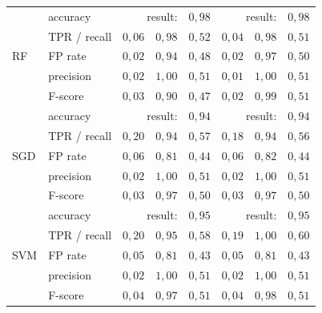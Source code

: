 \begin{table}[t]
{\begin{tabular}{llrrrrrr}
\midrule
\multirow{5}{*}{RF}  & accuracy     & \multicolumn{2}{r}{result:} & $0,98$            & \multicolumn{2}{r}{result:} & $0,98$              \\
                     & TPR / recall & $0,06$    & $0,98$          & $0,52$            & $0,04$    & $0,98$          & $0,51$              \\
                     & FP rate      & $0,02$    & $0,94$          & $0,48$            & $0,02$    & $0,97$          & $0,50$              \\
                     & precision    & $0,02$    & $1,00$          & $0,51$            & $0,01$    & $1,00$          & $0,51$              \\
                     & F-score      & $0,03$    & $0,90$          & $0,47$            & $0,02$    & $0,99$          & $0,51$              \\ 
\midrule
\multirow{5}{*}{SGD} & accuracy     & \multicolumn{2}{r}{result:} & $0,94$            & \multicolumn{2}{r}{result:} & $0,94$              \\
                     & TPR / recall & $0,20$    & $0,94$          & $0,57$            & $0,18$    & $0,94$          & $0,56$              \\
                     & FP rate      & $0,06$    & $0,81$          & $0,44$            & $0,06$    & $0,82$          & $0,44$              \\
                     & precision    & $0,02$    & $1,00$          & $0,51$            & $0,02$    & $1,00$          & $0,51$              \\
                     & F-score      & $0,03$    & $0,97$          & $0,50$            & $0,03$    & $0,97$          & $0,50$              \\ 
\midrule
\multirow{5}{*}{SVM} & accuracy     & \multicolumn{2}{r}{result:} & $0,95$            & \multicolumn{2}{r}{result:} & $0,95$              \\
                     & TPR / recall & $0,20$    & $0,95$          & $0,58$            & $0,19$    & $1,00$          & $0,60$              \\
                     & FP rate      & $0,05$    & $0,81$          & $0,43$            & $0,05$    & $0,81$          & $0,43$              \\
                     & precision    & $0,02$    & $1,00$          & $0,51$            & $0,02$    & $1,00$          & $0,51$              \\
                     & F-score      & $0,04$    & $0,97$          & $0,51$            & $0,04$    & $0,98$          & $0,51$              \\
\bottomrule
\end{tabular}
}
\end{table}


